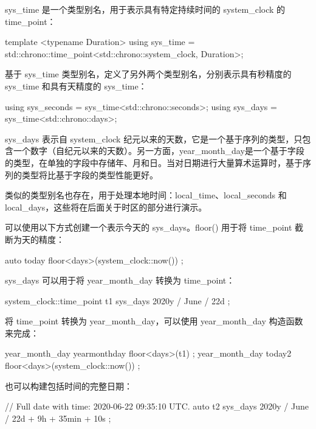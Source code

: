 sys\_time 是一个类型别名，用于表示具有特定持续时间的 system\_clock 的 time\_point：

\begin{cpp}
template <typename Duration>
using sys_time = std::chrono::time_point<std::chrono::system_clock, Duration>;
\end{cpp}

基于 sys\_time 类型别名，定义了另外两个类型别名，分别表示具有秒精度的 sys\_time 和具有天精度的 sys\_time：

\begin{cpp}
using sys_seconds = sys_time<std::chrono::seconds>;
using sys_days = sys_time<std::chrono::days>;
\end{cpp}

sys\_days 表示自 system\_clock 纪元以来的天数，它是一个基于序列的类型，只包含一个数字（自纪元以来的天数）。另一方面，year\_month\_day是一个基于字段的类型，在单独的字段中存储年、月和日。当对日期进行大量算术运算时，基于序列的类型将比基于字段的类型性能更好。

类似的类型别名也存在，用于处理本地时间：local\_time、local\_seconds 和 local\_days，这些将在后面关于时区的部分进行演示。

可以使用以下方式创建一个表示今天的 sys\_days。floor() 用于将 time\_point 截断为天的精度：

\begin{cpp}
auto today { floor<days>(system_clock::now()) };
\end{cpp}

sys\_days 可以用于将 year\_month\_day 转换为 time\_point：

\begin{cpp}
system_clock::time_point t1 { sys_days { 2020y / June / 22d } };
\end{cpp}

将 time\_point 转换为 year\_month\_day，可以使用 year\_month\_day 构造函数来完成：

\begin{cpp}
year_month_day yearmonthday { floor<days>(t1) };
year_month_day today2 { floor<days>(system_clock::now()) };
\end{cpp}

也可以构建包括时间的完整日期：

\begin{cpp}
// Full date with time: 2020-06-22 09:35:10 UTC.
auto t2 { sys_days { 2020y / June / 22d } + 9h + 35min + 10s };
\end{cpp}


